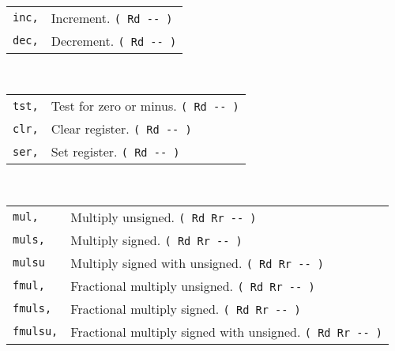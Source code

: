 \documentclass[10pt,landscape,a4paper]{article}
\begin{document}
\begin{multicols}{3}
\begin{tabular}{@{}ll@{}}
\end{tabular}\\
\begin{tabular}{@{}ll@{}}
\verb!inc,! & Increment. \verb!( Rd -- )! \\
\verb!dec,! & Decrement. \verb!( Rd -- )! \\
\end{tabular}\\
\begin{tabular}{@{}ll@{}}
\verb!tst,! & Test for zero or minus. \verb!( Rd -- )! \\
\verb!clr,! & Clear register. \verb!( Rd -- )! \\
\verb!ser,! & Set register. \verb!( Rd -- )! \\
\end{tabular}\\
\begin{tabular}{@{}ll@{}}
\verb!mul,! & Multiply unsigned. \verb!( Rd Rr -- )! \\
\verb!muls,! & Multiply signed. \verb!( Rd Rr -- )! \\
\verb!mulsu! & Multiply signed with unsigned. \verb!( Rd Rr -- )! \\
\verb!fmul,! & Fractional multiply unsigned. \verb!( Rd Rr -- )! \\
\verb!fmuls,! & Fractional multiply signed. \verb!( Rd Rr -- )! \\
\verb!fmulsu,! & Fractional multiply signed with unsigned. \verb!( Rd Rr -- )! \\
\end{tabular}\\

\medskip


\end{multicols}
\end{document}

